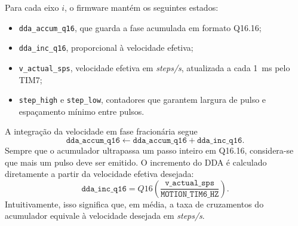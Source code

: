 Para cada eixo $i$, o firmware mant\'em os seguintes estados:
\begin{itemize}
\item \texttt{dda\_accum\_q16}, que guarda a fase acumulada em formato
  Q16.16;
\item \texttt{dda\_inc\_q16}, proporcional \`a velocidade efetiva;
\item \texttt{v\_actual\_sps}, velocidade efetiva em \emph{steps/s},
  atualizada a cada \SI{1}{\milli\second} pelo TIM7;
\item \texttt{step\_high} e \texttt{step\_low}, contadores que garantem
  largura de pulso e espa\c{c}amento m\'inimo entre pulsos.
\end{itemize}

A integra\c{c}\~ao da velocidade em fase fracion\'aria segue
\begin{equation}
    \texttt{dda\_accum\_q16}
    \leftarrow
    \texttt{dda\_accum\_q16}
    +
    \texttt{dda\_inc\_q16}.
\end{equation}
Sempre que o acumulador ultrapassa um passo inteiro em Q16.16,
considera-se que mais um pulso deve ser emitido. O incremento do DDA \'e
calculado diretamente a partir da velocidade efetiva desejada:
\begin{equation}
    \texttt{dda\_inc\_q16}
    =
    Q16\!\left(
        \frac{\texttt{v\_actual\_sps}}
             {\texttt{MOTION\_TIM6\_HZ}}
    \right).
\end{equation}
Intuitivamente, isso significa que, em m\'edia, a taxa de cruzamentos do
acumulador equivale \`a velocidade desejada em \emph{steps/s}.

